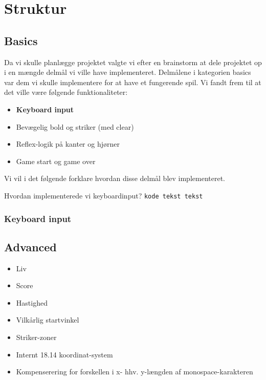 \chapter{Struktur}
\section{Basics}
Da vi skulle planlægge projektet valgte vi efter en brainstorm at dele projektet op i en mængde delmål vi ville have implementeret. Delmålene i kategorien basics var dem vi skulle implementere for at have et fungerende spil. Vi fandt frem til at det ville være følgende funktionaliteter:
\begin{itemize}
\item \textbf{Keyboard input}
\item Bevægelig bold og striker (med clear)
\item Reflex-logik på kanter og hjørner
\item Game start og game over
\end{itemize}
Vi vil i det følgende forklare hvordan disse delmål blev implementeret. 

Hvordan implementerede vi keyboardinput?
\texttt{kode tekst tekst}

\subsection{Keyboard input}


\section{Advanced}
\begin{itemize}
\item Liv
\item Score
\item Hastighed
\item Vilkårlig startvinkel
\item Striker-zoner
\item Internt 18.14 koordinat-system
\item Kompenserering for forskellen i x- hhv. y-længden af monospace-karakteren
\end{itemize}

